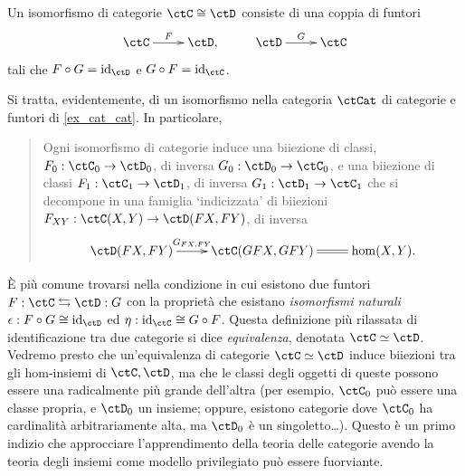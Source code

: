 \begin{definition}\label{fun_isocat}
	Un isomorfismo di categorie \(\ctC\cong\ctD\) consiste di una coppia di funtori
	\[\xymatrix{
			\ctC \ar[r]^-F & \ctD, & \ctD \ar[r]^-G & \ctC
		}\]
	tali che \(F\cmp G = \Id[\ctD]\) e \(G\cmp F = \Id[\ctC]\).

	Si tratta, evidentemente, di un isomorfismo nella categoria \(\ctCat\) di categorie e funtori di \ref{ex_cat_cat}. In particolare,
	\begin{quote}
		Ogni isomorfismo di categorie induce una biiezione di classi, \(F_0 : \ctC_0\to\ctD_0\), di inversa \(G_0 : \ctD_0\to\ctC_0\), e una biiezione di classi \(F_1 : \ctC_1 \to \ctD_1\), di inversa \(G_1 : \ctD_1\to\ctC_1\) che si decompone in una famiglia `indicizzata' di biiezioni \(F_{XY} : \Hom\ctC(X,Y)\to\Hom\ctD(FX,FY)\), di inversa
		\[\xymatrix{
			\Hom\ctD(FX,FY) \ar[r]^-{G_{FX,FY}} & \Hom\ctC(GFX,GFY) \ar@{=}[r] & \hom(X,Y).
			}\]
	\end{quote}
\end{definition}
\`E più comune trovarsi nella condizione in cui esistono due funtori \(F : \ctC \leftrightarrows \ctD: G\) con la proprietà che esistano \emph{isomorfismi naturali} \(\epsilon : F\cmp G \cong \Id[\ctD]\) ed \(\eta : \Id[\ctC]\cong G\cmp F\). Questa definizione più rilassata di identificazione tra due categorie si dice \emph{equivalenza}, denotata \(\ctC\simeq\ctD\). Vedremo presto che un'equivalenza di categorie \(\ctC\simeq\ctD\) induce biiezioni tra gli hom-insiemi di \(\ctC,\ctD\), ma che le classi degli oggetti di queste possono essere una radicalmente più grande dell'altra (per esempio, \(\ctC_0\) può essere una classe propria, e \(\ctD_0\) un insieme; oppure, esistono categorie dove \(\ctC_0\) ha cardinalità arbitrariamente alta, ma \(\ctD_0\) è un singoletto\dots). Questo è un primo indizio che approcciare l'apprendimento della teoria delle categorie avendo la teoria degli insiemi come modello privilegiato può essere fuorviante.

